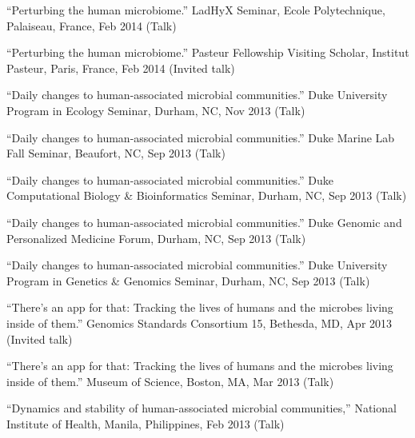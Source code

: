 \documentclass[overlapped,line,11pt]{res}
\begin{document}
\begin{resume}
\begin{revnumerate}[39]
\item {``Perturbing the human microbiome.''  LadHyX Seminar, Ecole
  Polytechnique, Palaiseau, France, Feb 2014 (Talk)}
\vspace*{0mm}

\item {``Perturbing the human microbiome.''
  Pasteur Fellowship Visiting Scholar, Institut Pasteur,
  Paris, France, Feb 2014 (Invited talk)}
\vspace*{0mm}

\item {``Daily changes to human-associated microbial communities.''
  Duke University Program in Ecology Seminar,
  Durham, NC, Nov 2013 (Talk)}
\vspace*{0mm}

\item {``Daily changes to human-associated microbial communities.''
  Duke Marine Lab Fall Seminar,
  Beaufort, NC, Sep 2013 (Talk)}
\vspace*{0mm}

\item {``Daily changes to human-associated microbial communities.''
  Duke Computational Biology \& Bioinformatics Seminar,
  Durham, NC, Sep 2013 (Talk)}
\vspace*{0mm}

\item {``Daily changes to human-associated microbial communities.''
  Duke Genomic and Personalized Medicine Forum,
  Durham, NC, Sep 2013 (Talk)}
\vspace*{0mm}

\item {``Daily changes to human-associated microbial communities.''
  Duke University Program in Genetics \& Genomics Seminar,
  Durham, NC, Sep 2013 (Talk)}
\vspace*{0mm}

\item {``There's an app for that: Tracking the lives of humans and the
  microbes living inside of them.'' Genomics Standards Consortium 15,
  Bethesda, MD, Apr 2013 (Invited talk)}
\vspace*{0mm}

\item {``There's an app for that: Tracking the lives of humans and
  the microbes living inside of them.'' Museum of Science, Boston,
  MA, Mar 2013 (Talk)}
\vspace*{0mm}

\item {``Dynamics and stability of human-associated microbial
  communities,'' National Institute of Health, Manila,
  Philippines, Feb 2013 (Talk)}
\vspace*{0mm}


\end{revnumerate}
\end{resume}
\end{document}
